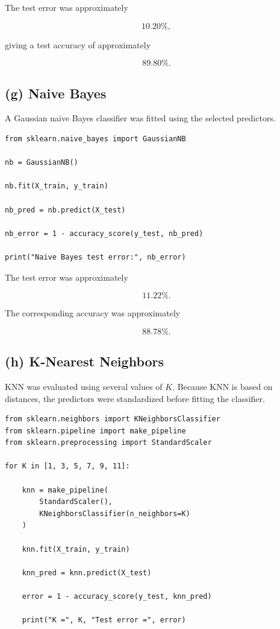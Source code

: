 \documentclass[12pt,a4paper]{article}
\begin{document}
The test error was approximately

\[
\boxed{10.20\%},
\]

giving a test accuracy of approximately

\[
\boxed{89.80\%}.
\]

\subsection{(g) Naive Bayes}

A Gaussian naive Bayes classifier was fitted using the selected predictors.

\begin{lstlisting}
from sklearn.naive_bayes import GaussianNB

nb = GaussianNB()

nb.fit(X_train, y_train)

nb_pred = nb.predict(X_test)

nb_error = 1 - accuracy_score(y_test, nb_pred)

print("Naive Bayes test error:", nb_error)
\end{lstlisting}

The test error was approximately

\[
\boxed{11.22\%}.
\]

The corresponding accuracy was approximately

\[
\boxed{88.78\%}.
\]

\subsection{(h) K-Nearest Neighbors}

KNN was evaluated using several values of $K$. Because KNN is based on
distances, the predictors were standardized before fitting the classifier.

\begin{lstlisting}
from sklearn.neighbors import KNeighborsClassifier
from sklearn.pipeline import make_pipeline
from sklearn.preprocessing import StandardScaler

for K in [1, 3, 5, 7, 9, 11]:

    knn = make_pipeline(
        StandardScaler(),
        KNeighborsClassifier(n_neighbors=K)
    )

    knn.fit(X_train, y_train)

    knn_pred = knn.predict(X_test)

    error = 1 - accuracy_score(y_test, knn_pred)

    print("K =", K, "Test error =", error)
\end{lstlisting}
\end{document}
